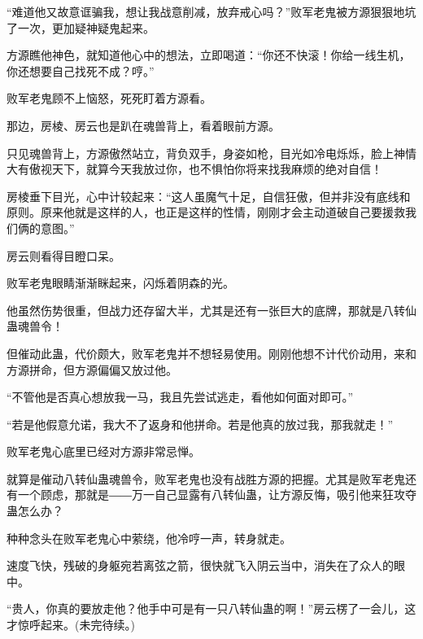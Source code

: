 \begin{this_body}
“难道他又故意诓骗我，想让我战意削减，放弃戒心吗？”败军老鬼被方源狠狠地坑了一次，更加疑神疑鬼起来。

方源瞧他神色，就知道他心中的想法，立即喝道：“你还不快滚！你给一线生机，你还想要自己找死不成？哼。”

败军老鬼顾不上恼怒，死死盯着方源看。

那边，房棱、房云也是趴在魂兽背上，看着眼前方源。

只见魂兽背上，方源傲然站立，背负双手，身姿如枪，目光如冷电烁烁，脸上神情大有傲视天下，就算今天我放过你，也不惧怕你将来找我麻烦的绝对自信！

房棱垂下目光，心中计较起来：“这人虽魔气十足，自信狂傲，但并非没有底线和原则。原来他就是这样的人，也正是这样的性情，刚刚才会主动道破自己要援救我们俩的意图。”

房云则看得目瞪口呆。

败军老鬼眼睛渐渐眯起来，闪烁着阴森的光。

他虽然伤势很重，但战力还存留大半，尤其是还有一张巨大的底牌，那就是八转仙蛊魂兽令！

但催动此蛊，代价颇大，败军老鬼并不想轻易使用。刚刚他想不计代价动用，来和方源拼命，但方源偏偏又放过他。

“不管他是否真心想放我一马，我且先尝试逃走，看他如何面对即可。”

“若是他假意允诺，我大不了返身和他拼命。若是他真的放过我，那我就走！”

败军老鬼心底里已经对方源非常忌惮。

就算是催动八转仙蛊魂兽令，败军老鬼也没有战胜方源的把握。尤其是败军老鬼还有一个顾虑，那就是――万一自己显露有八转仙蛊，让方源反悔，吸引他来狂攻夺蛊怎么办？

种种念头在败军老鬼心中萦绕，他冷哼一声，转身就走。

速度飞快，残破的身躯宛若离弦之箭，很快就飞入阴云当中，消失在了众人的眼中。

“贵人，你真的要放走他？他手中可是有一只八转仙蛊的啊！”房云楞了一会儿，这才惊呼起来。(未完待续。)

\end{this_body}

